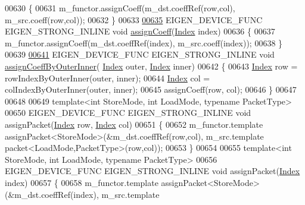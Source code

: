 \begin{DoxyCode}
00630   \{
00631     m\_functor.assignCoeff(m\_dst.coeffRef(row,col), m\_src.coeff(row,col));
00632   \}
00633   
\hyperlink{class_eigen_1_1internal_1_1generic__dense__assignment__kernel_a9f36120222600d1d843b4253b08a383b}{00635}   EIGEN\_DEVICE\_FUNC EIGEN\_STRONG\_INLINE \textcolor{keywordtype}{void} \hyperlink{class_eigen_1_1internal_1_1generic__dense__assignment__kernel_a9f36120222600d1d843b4253b08a383b}{assignCoeff}(\hyperlink{namespace_eigen_a62e77e0933482dafde8fe197d9a2cfde}{Index} index)
00636   \{
00637     m\_functor.assignCoeff(m\_dst.coeffRef(index), m\_src.coeff(index));
00638   \}
00639   
\hyperlink{class_eigen_1_1internal_1_1generic__dense__assignment__kernel_aff1bc113e270d4f895ca90570536303b}{00641}   EIGEN\_DEVICE\_FUNC EIGEN\_STRONG\_INLINE \textcolor{keywordtype}{void} \hyperlink{class_eigen_1_1internal_1_1generic__dense__assignment__kernel_aff1bc113e270d4f895ca90570536303b}{assignCoeffByOuterInner}(
      \hyperlink{namespace_eigen_a62e77e0933482dafde8fe197d9a2cfde}{Index} outer, \hyperlink{namespace_eigen_a62e77e0933482dafde8fe197d9a2cfde}{Index} inner)
00642   \{
00643     \hyperlink{namespace_eigen_a62e77e0933482dafde8fe197d9a2cfde}{Index} row = rowIndexByOuterInner(outer, inner); 
00644     \hyperlink{namespace_eigen_a62e77e0933482dafde8fe197d9a2cfde}{Index} col = colIndexByOuterInner(outer, inner); 
00645     assignCoeff(row, col);
00646   \}
00647   
00648   
00649   \textcolor{keyword}{template}<\textcolor{keywordtype}{int} StoreMode, \textcolor{keywordtype}{int} LoadMode, \textcolor{keyword}{typename} PacketType>
00650   EIGEN\_DEVICE\_FUNC EIGEN\_STRONG\_INLINE \textcolor{keywordtype}{void} assignPacket(\hyperlink{namespace_eigen_a62e77e0933482dafde8fe197d9a2cfde}{Index} row, \hyperlink{namespace_eigen_a62e77e0933482dafde8fe197d9a2cfde}{Index} col)
00651   \{
00652     m\_functor.template assignPacket<StoreMode>(&m\_dst.coeffRef(row,col), m\_src.template 
      packet<LoadMode,PacketType>(row,col));
00653   \}
00654   
00655   \textcolor{keyword}{template}<\textcolor{keywordtype}{int} StoreMode, \textcolor{keywordtype}{int} LoadMode, \textcolor{keyword}{typename} PacketType>
00656   EIGEN\_DEVICE\_FUNC EIGEN\_STRONG\_INLINE \textcolor{keywordtype}{void} assignPacket(\hyperlink{namespace_eigen_a62e77e0933482dafde8fe197d9a2cfde}{Index} index)
00657   \{
00658     m\_functor.template assignPacket<StoreMode>(&m\_dst.coeffRef(index), m\_src.template 

\end{DoxyCode}
